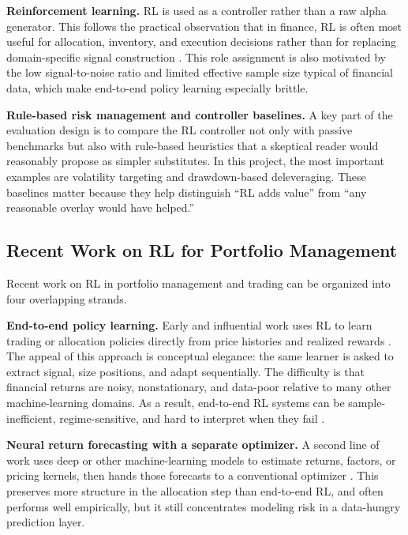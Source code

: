 \documentclass[10pt,twocolumn]{article}
\begin{document}
\textbf{Reinforcement learning.} RL is used as a controller rather than a raw
alpha generator. This follows the practical observation that in finance, RL is
often most useful for allocation, inventory, and execution decisions rather than
for replacing domain-specific signal construction \cite{sutton2018,almgren2000}.
This role assignment is also motivated by the low signal-to-noise ratio and
limited effective sample size typical of financial data, which make end-to-end
policy learning especially brittle.

\textbf{Rule-based risk management and controller baselines.} A key part of the
evaluation design is to compare the RL controller not only with passive
benchmarks but also with rule-based heuristics that a skeptical reader would
reasonably propose as simpler substitutes. In this project, the most important
examples are volatility targeting and drawdown-based deleveraging. These
baselines matter because they help distinguish ``RL adds value'' from ``any
reasonable overlay would have helped.''

\subsection{Recent Work on RL for Portfolio Management}

Recent work on RL in portfolio management and trading can be organized into four
overlapping strands.

\textbf{End-to-end policy learning.} Early and influential work uses RL to learn
trading or allocation policies directly from price histories and realized
rewards \cite{moody2001,deng2017,jiang2017,zhang2020,cong2021,pacheco2023}. The appeal of
this approach is conceptual elegance: the same learner is asked to extract
signal, size positions, and adapt sequentially. The difficulty is that
financial returns are noisy, nonstationary, and data-poor relative to many
other machine-learning domains. As a result, end-to-end RL systems can be
sample-inefficient, regime-sensitive, and hard to interpret when they fail
\cite{gu2020,kolm2019,jander2025}.

\textbf{Neural return forecasting with a separate optimizer.} A second line of
work uses deep or other machine-learning models to estimate returns, factors, or
pricing kernels, then hands those forecasts to a conventional optimizer
\cite{gu2020,chen2021,giglio2022}. This preserves more structure in the
allocation step than end-to-end RL, and often performs well empirically, but it
still concentrates modeling risk in a data-hungry prediction layer.
\end{document}
